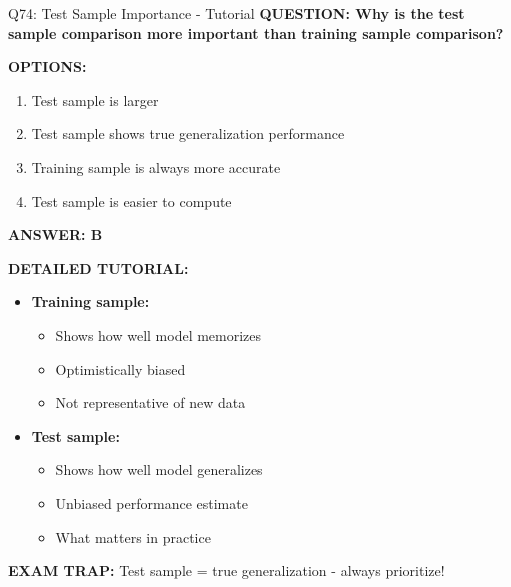\documentclass[8pt]{beamer}
\begin{document}
	\begin{frame}{Q74: Test Sample Importance - Tutorial}
		\fontsize{6.5}{7.5}\selectfont
		\textbf{QUESTION: Why is the test sample comparison more important than training sample comparison?}
		
		\vspace{0.1cm}
		\textbf{OPTIONS:}
		\begin{enumerate}
			\item Test sample is larger
			\item Test sample shows true generalization performance
			\item Training sample is always more accurate
			\item Test sample is easier to compute
		\end{enumerate}
		
		\vspace{0.1cm}
		\textcolor{myblue}{\textbf{ANSWER: B}}
		
		\vspace{0.1cm}
		\textbf{DETAILED TUTORIAL:}
		\begin{itemize}
			\item \textbf{Training sample:}
			\begin{itemize}
				\item Shows how well model memorizes
				\item Optimistically biased
				\item Not representative of new data
			\end{itemize}
			\item \textbf{Test sample:}
			\begin{itemize}
				\item Shows how well model generalizes
				\item Unbiased performance estimate
				\item What matters in practice
			\end{itemize}
		\end{itemize}
		
		\textcolor{myred}{\textbf{EXAM TRAP:}} Test sample = \textcolor{myblue}{true generalization} - always prioritize!
	\end{frame}
	
\end{document}
